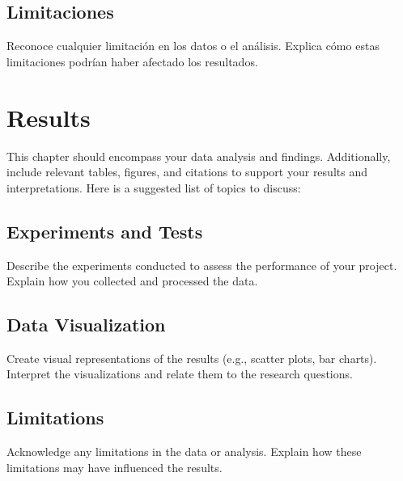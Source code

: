     \section{Limitaciones}
    Reconoce cualquier limitación en los datos o el análisis. Explica cómo estas limitaciones podrían haber afectado los resultados.
  
\else
  \chapter{Results}
  This chapter should encompass your data analysis and findings. Additionally, include relevant tables, figures, and citations to support your results and interpretations. Here is a suggested list of topics to discuss:
  
    \section{Experiments and Tests}
    Describe the experiments conducted to assess the performance of your project. Explain how you collected and processed the data.
    
    \section{Data Visualization}
    Create visual representations of the results (e.g., scatter plots, bar charts). Interpret the visualizations and relate them to the research questions.
    
    \section{Limitations}
    Acknowledge any limitations in the data or analysis. Explain how these limitations may have influenced the results.

\fi

